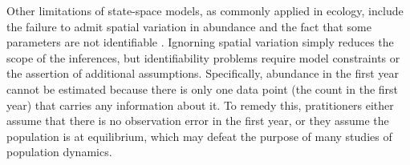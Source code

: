 \documentclass[12pt]{article}
\begin{document}
Other limitations of state-space models, as commonly applied in ecology,
include the failure to admit spatial variation in abundance and
the fact that some parameters are not identifiable
\citep{polansky_etal:2009}. 
Ignorning spatial variation simply reduces the scope of the
inferences, 
but identifiability problems require %
model constraints or the assertion of additional assumptions. 
Specifically, abundance in
the first year cannot be estimated because there is only one data
point (the count in the first year) that carries any information about
it. To remedy this, pratitioners either assume that there is no
observation error in the first year, or they assume the population is
at equilibrium, which may defeat the purpose of many studies of
population dynamics. 
\end{document}
